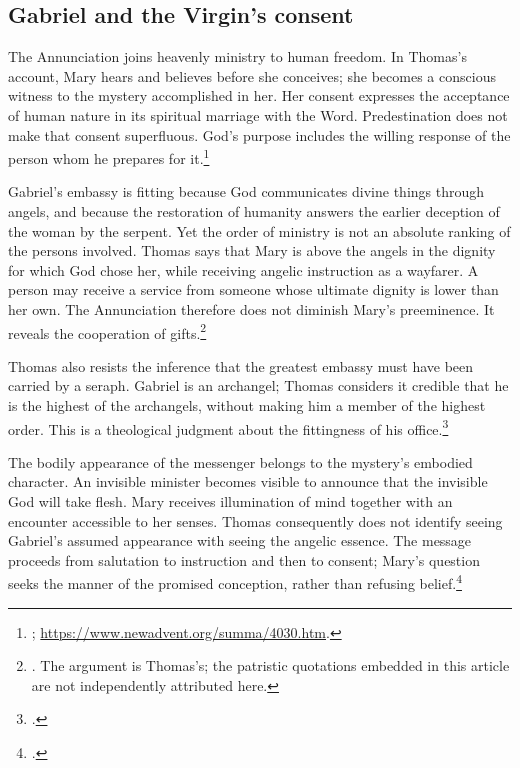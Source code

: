 \subsection{Gabriel and the Virgin's consent}

The Annunciation joins heavenly ministry to human freedom. In Thomas's account,
Mary hears and believes before she conceives; she becomes a conscious witness
to the mystery accomplished in her. Her consent expresses the acceptance of
human nature in its spiritual marriage with the Word. Predestination does not
make that consent superfluous. God's purpose includes the willing response of
the person whom he prepares for it.\footnote{; \url{https://www.newadvent.org/summa/4030.htm}.}

Gabriel's embassy is fitting because God communicates divine things through
angels, and because the restoration of humanity answers the earlier deception
of the woman by the serpent. Yet the order of ministry is not an absolute
ranking of the persons involved. Thomas says that Mary is above the angels
in the dignity for which God chose her, while receiving angelic instruction
as a wayfarer. A person may receive a service from someone whose ultimate
dignity is lower than her own. The Annunciation therefore does not diminish
Mary's preeminence. It reveals the cooperation of gifts.\footnote{. The argument is Thomas's; the patristic
quotations embedded in this article are not independently attributed here.}

Thomas also resists the inference that the greatest embassy must have been
carried by a seraph. Gabriel is an archangel; Thomas considers it credible
that he is the highest of the archangels, without making him a member of the
highest order. This is a theological judgment about the fittingness of his
office.\footnote{.}

The bodily appearance of the messenger belongs to the mystery's embodied
character. An invisible minister becomes visible to announce that the
invisible God will take flesh. Mary receives illumination of mind together
with an encounter accessible to her senses. Thomas consequently does not
identify seeing Gabriel's assumed appearance with seeing the angelic essence.
The message proceeds from salutation to instruction and then to consent;
Mary's question seeks the manner of the promised conception, rather than
refusing belief.\footnote{.}

